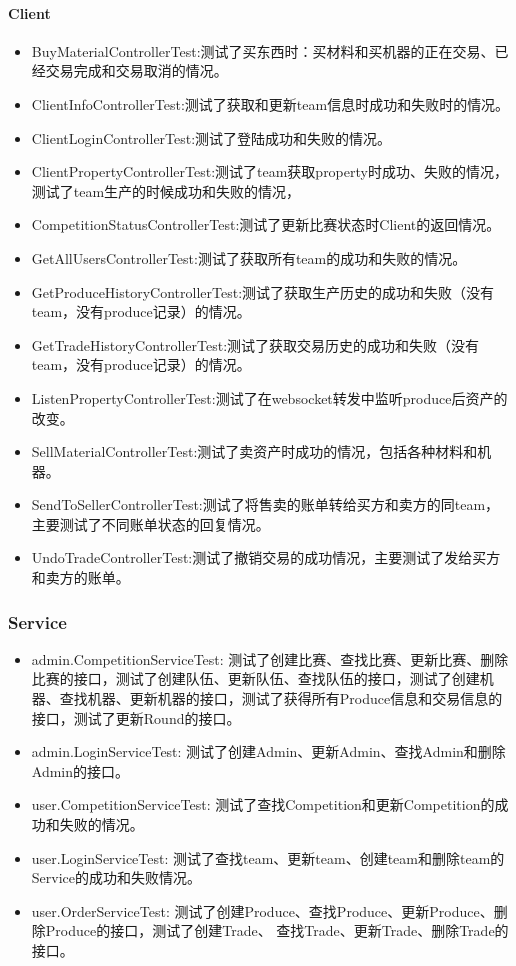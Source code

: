 \documentclass{article}
\begin{document}
		\paragraph{Client}
			\begin{itemize}
			\item BuyMaterialControllerTest:测试了买东西时：买材料和买机器的正在交易、已经交易完成和交易取消的情况。
			\item ClientInfoControllerTest:测试了获取和更新team信息时成功和失败时的情况。
			\item ClientLoginControllerTest:测试了登陆成功和失败的情况。
			\item ClientPropertyControllerTest:测试了team获取property时成功、失败的情况，测试了team生产的时候成功和失败的情况，
			\item CompetitionStatusControllerTest:测试了更新比赛状态时Client的返回情况。
			\item GetAllUsersControllerTest:测试了获取所有team的成功和失败的情况。
			\item GetProduceHistoryControllerTest:测试了获取生产历史的成功和失败（没有team，没有produce记录）的情况。
			\item GetTradeHistoryControllerTest:测试了获取交易历史的成功和失败（没有team，没有produce记录）的情况。
			\item ListenPropertyControllerTest:测试了在websocket转发中监听produce后资产的改变。
			\item SellMaterialControllerTest:测试了卖资产时成功的情况，包括各种材料和机器。
			\item SendToSellerControllerTest:测试了将售卖的账单转给买方和卖方的同team，主要测试了不同账单状态的回复情况。
			\item UndoTradeControllerTest:测试了撤销交易的成功情况，主要测试了发给买方和卖方的账单。
			\end{itemize}
	\subsubsection{Service}
		\begin{itemize}
			\item admin.CompetitionServiceTest: 测试了创建比赛、查找比赛、更新比赛、删除比赛的接口，测试了创建队伍、更新队伍、查找队伍的接口，测试了创建机器、查找机器、更新机器的接口，测试了获得所有Produce信息和交易信息的接口，测试了更新Round的接口。
			\item admin.LoginServiceTest: 测试了创建Admin、更新Admin、查找Admin和删除Admin的接口。
			\item user.CompetitionServiceTest: 测试了查找Competition和更新Competition的成功和失败的情况。
			\item user.LoginServiceTest: 测试了查找team、更新team、创建team和删除team的Service的成功和失败情况。
			\item user.OrderServiceTest: 测试了创建Produce、查找Produce、更新Produce、删除Produce的接口，测试了创建Trade、 查找Trade、更新Trade、删除Trade的接口。
		\end{itemize}
\end{document}

